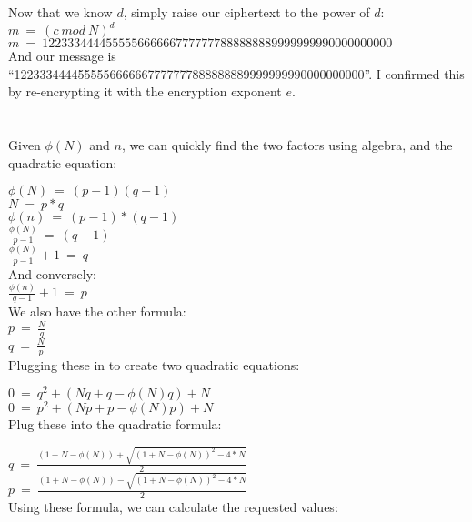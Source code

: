 \documentclass[10pt]{article}
\begin{document}
\noindent Now that we know $d$, simply raise our ciphertext to the power of $d$:\\

\noindent $m\ =\ (c\ mod\ N)^d$\\
$m\ =\ 1223334444555556666667777777888888889999999990000000000$\\

And our message is ``1223334444555556666667777777888888889999999990000000000''. I
confirmed this by re-encrypting it with the encryption exponent $e$.

\section{}
Given $\phi(N)$ and $n$, we can quickly find the two factors using algebra, and the
quadratic equation:

\noindent $\phi(N)\ =\ (p-1)(q-1)$\\
$N\ =\ p*q$\\

$\phi(n)\ =\ (p-1)*(q-1)$\\
$\frac{\phi(N)}{p-1}\ =\ (q-1)$\\
$\frac{\phi(N)}{p-1}+1\ =\ q$\\

\noindent And conversely:\\

$\frac{\phi(n)}{q-1}+1\ =\ p$\\

We also have the other formula:\\

\noindent $p\ =\ \frac{N}{q}$\\
$q\ =\ \frac{N}{p}$\\

Plugging these in to create two quadratic equations:

\noindent $0\ =\ q^2+(Nq+q-\phi(N)q)+N$\\
\noindent $0\ =\ p^2+(Np+p-\phi(N)p)+N$\\

Plug these into the quadratic formula:

\noindent $q\ =\ \frac{(1+N-\phi(N)) + \sqrt{(1+N-\phi(N))^2-4*N}}{2}$\\
\noindent $p\ =\ \frac{(1+N-\phi(N)) - \sqrt{(1+N-\phi(N))^2-4*N}}{2}$\\

Using these formula, we can calculate the requested values:\\
\end{document}
